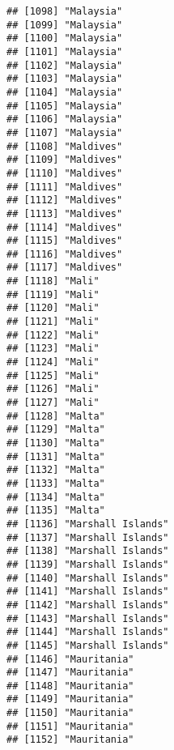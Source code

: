 \documentclass[]{article}
\begin{document}
\begin{verbatim}
## [1098] "Malaysia"                           
## [1099] "Malaysia"                           
## [1100] "Malaysia"                           
## [1101] "Malaysia"                           
## [1102] "Malaysia"                           
## [1103] "Malaysia"                           
## [1104] "Malaysia"                           
## [1105] "Malaysia"                           
## [1106] "Malaysia"                           
## [1107] "Malaysia"                           
## [1108] "Maldives"                           
## [1109] "Maldives"                           
## [1110] "Maldives"                           
## [1111] "Maldives"                           
## [1112] "Maldives"                           
## [1113] "Maldives"                           
## [1114] "Maldives"                           
## [1115] "Maldives"                           
## [1116] "Maldives"                           
## [1117] "Maldives"                           
## [1118] "Mali"                               
## [1119] "Mali"                               
## [1120] "Mali"                               
## [1121] "Mali"                               
## [1122] "Mali"                               
## [1123] "Mali"                               
## [1124] "Mali"                               
## [1125] "Mali"                               
## [1126] "Mali"                               
## [1127] "Mali"                               
## [1128] "Malta"                              
## [1129] "Malta"                              
## [1130] "Malta"                              
## [1131] "Malta"                              
## [1132] "Malta"                              
## [1133] "Malta"                              
## [1134] "Malta"                              
## [1135] "Malta"                              
## [1136] "Marshall Islands"                   
## [1137] "Marshall Islands"                   
## [1138] "Marshall Islands"                   
## [1139] "Marshall Islands"                   
## [1140] "Marshall Islands"                   
## [1141] "Marshall Islands"                   
## [1142] "Marshall Islands"                   
## [1143] "Marshall Islands"                   
## [1144] "Marshall Islands"                   
## [1145] "Marshall Islands"                   
## [1146] "Mauritania"                         
## [1147] "Mauritania"                         
## [1148] "Mauritania"                         
## [1149] "Mauritania"                         
## [1150] "Mauritania"                         
## [1151] "Mauritania"                         
## [1152] "Mauritania"                         

\end{verbatim}
\end{document}
